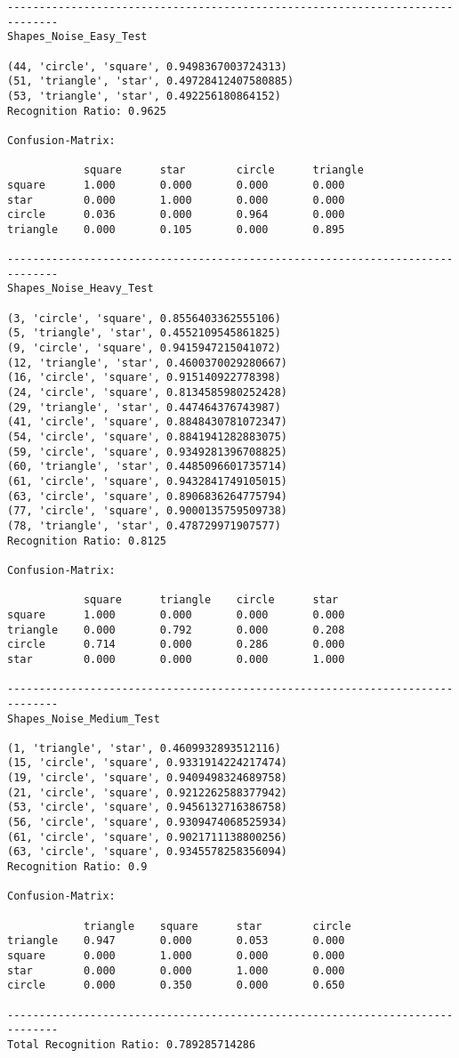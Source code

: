 \documentclass[a4paper, 10pt]{article}
\begin{document}
\begin{verbatim}
------------------------------------------------------------------------------
Shapes_Noise_Easy_Test

(44, 'circle', 'square', 0.9498367003724313)
(51, 'triangle', 'star', 0.49728412407580885)
(53, 'triangle', 'star', 0.492256180864152)
Recognition Ratio: 0.9625

Confusion-Matrix:

            square      star        circle      triangle    
square      1.000       0.000       0.000       0.000       
star        0.000       1.000       0.000       0.000       
circle      0.036       0.000       0.964       0.000       
triangle    0.000       0.105       0.000       0.895       

------------------------------------------------------------------------------
Shapes_Noise_Heavy_Test

(3, 'circle', 'square', 0.8556403362555106)
(5, 'triangle', 'star', 0.4552109545861825)
(9, 'circle', 'square', 0.9415947215041072)
(12, 'triangle', 'star', 0.4600370029280667)
(16, 'circle', 'square', 0.915140922778398)
(24, 'circle', 'square', 0.8134585980252428)
(29, 'triangle', 'star', 0.447464376743987)
(41, 'circle', 'square', 0.8848430781072347)
(54, 'circle', 'square', 0.8841941282883075)
(59, 'circle', 'square', 0.9349281396708825)
(60, 'triangle', 'star', 0.4485096601735714)
(61, 'circle', 'square', 0.9432841749105015)
(63, 'circle', 'square', 0.8906836264775794)
(77, 'circle', 'square', 0.9000135759509738)
(78, 'triangle', 'star', 0.478729971907577)
Recognition Ratio: 0.8125

Confusion-Matrix:

            square      triangle    circle      star        
square      1.000       0.000       0.000       0.000       
triangle    0.000       0.792       0.000       0.208       
circle      0.714       0.000       0.286       0.000       
star        0.000       0.000       0.000       1.000       

------------------------------------------------------------------------------
Shapes_Noise_Medium_Test

(1, 'triangle', 'star', 0.4609932893512116)
(15, 'circle', 'square', 0.9331914224217474)
(19, 'circle', 'square', 0.9409498324689758)
(21, 'circle', 'square', 0.9212262588377942)
(53, 'circle', 'square', 0.9456132716386758)
(56, 'circle', 'square', 0.9309474068525934)
(61, 'circle', 'square', 0.9021711138800256)
(63, 'circle', 'square', 0.9345578258356094)
Recognition Ratio: 0.9

Confusion-Matrix:

            triangle    square      star        circle      
triangle    0.947       0.000       0.053       0.000       
square      0.000       1.000       0.000       0.000       
star        0.000       0.000       1.000       0.000       
circle      0.000       0.350       0.000       0.650       

------------------------------------------------------------------------------
Total Recognition Ratio: 0.789285714286
\end{verbatim}
	
\end{document}
